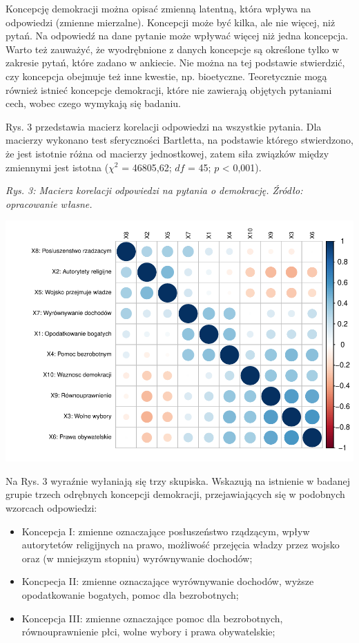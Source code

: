 \documentclass[12pt]{article}
\providecommand{\tightlist}{%
  \setlength{\itemsep}{0pt}\setlength{\parskip}{0pt}}
\begin{document}
Koncepcję demokracji można opisać zmienną latentną, która wpływa na odpowiedzi (zmienne mierzalne). Koncepcji może być kilka, ale nie więcej, niż pytań. Na odpowiedź na dane pytanie może wpływać więcej niż jedna koncepcja. Warto też zauważyć, że wyodrębnione z danych koncepcje są określone tylko w zakresie pytań, które zadano w ankiecie. Nie można na tej podstawie stwierdzić, czy koncepcja obejmuje też inne kwestie, np. bioetyczne. Teoretycznie mogą również istnieć koncepcje demokracji, które nie zawierają objętych pytaniami cech, wobec czego wymykają się badaniu.

Rys. 3 przedstawia macierz korelacji odpowiedzi na wszystkie pytania. Dla macierzy wykonano test sferyczności Bartletta, na podstawie którego stwierdzono, że jest istotnie różna od macierzy jednostkowej, zatem siła związków między zmiennymi jest istotna (\(\chi^2\) = 46805,62; \(df\) = 45; \(p\) \textless{} 0,001).

\emph{Rys. 3: Macierz korelacji odpowiedzi na pytania o demokrację. Źródło: opracowanie własne.}

\begin{flushleft}\includegraphics{text_ASA_files/figure-latex/cor-matrix-1} \end{flushleft}

Na Rys. 3 wyraźnie wyłaniają się trzy skupiska. Wskazują na istnienie w badanej grupie trzech odrębnych koncepcji demokracji, przejawiających się w podobnych wzorcach odpowiedzi:

\begin{itemize}
\tightlist
\item
  Koncepcja I: zmienne oznaczające posłuszeństwo rządzącym, wpływ autorytetów religijnych na prawo, możliwość przejęcia władzy przez wojsko oraz (w mniejszym stopniu) wyrównywanie dochodów;
\item
  Koncpecja II: zmienne oznaczające wyrównywanie dochodów, wyższe opodatkowanie bogatych, pomoc dla bezrobotnych;
\item
  Koncepcja III: zmienne oznaczające pomoc dla bezrobotnych, równouprawnienie płci, wolne wybory i prawa obywatelskie;
\end{itemize}
\end{document}
